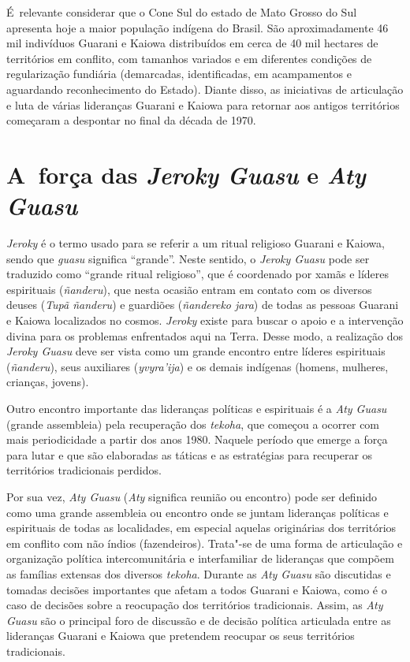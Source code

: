 É~relevante considerar que o Cone Sul do estado de Mato Grosso do Sul
apresenta hoje a maior população indígena do Brasil. São
aproximadamente 46 mil indivíduos Guarani e Kaiowa distribuídos em
cerca de 40 mil hectares de territórios em conflito, com tamanhos
variados e em diferentes condições de regularização fundiária
(demarcadas, identificadas, em acampamentos e aguardando reconhecimento
do Estado). Diante disso, as iniciativas de articulação e luta de
várias lideranças Guarani e Kaiowa para retornar aos antigos
territórios começaram a despontar no final da década de 1970.

\section{A~força das \emph{Jeroky Guasu} e \emph{Aty Guasu}}

\emph{Jeroky} é o termo usado para se referir a um ritual religioso Guarani e
Kaiowa, sendo que \emph{guasu} significa ``grande''. Neste sentido, o \emph{Jeroky
Guasu} pode ser traduzido como ``grande ritual religioso'', que é
coordenado por xamãs e líderes espirituais (\emph{ñanderu}), que nesta ocasião
entram em contato com os diversos deuses (\emph{Tupã ñanderu}) e guardiões
(\emph{ñandereko jara}) de todas as pessoas Guarani e Kaiowa localizados no
cosmos. \emph{Jeroky} existe para buscar o apoio e a intervenção divina para
os problemas enfrentados aqui na Terra. Desse modo, a realização dos
\emph{Jeroky Guasu} deve ser vista como um grande encontro entre líderes
espirituais (\emph{ñanderu}), seus auxiliares (\emph{yvyra’ija}) e os demais
indígenas (homens, mulheres, crianças, jovens). 

Outro encontro importante das lideranças políticas e espirituais é a \emph{Aty
Guasu} (grande assembleia) pela recuperação dos \emph{tekoha}, que começou a
ocorrer com mais periodicidade a partir dos anos 1980. Naquele período
que emerge a força para lutar e que são elaboradas as táticas e as
estratégias para recuperar os territórios tradicionais perdidos.

Por sua vez, \emph{Aty Guasu} (\emph{Aty} significa reunião ou encontro) pode ser
definido como uma grande assembleia ou encontro onde se juntam
lideranças políticas e espirituais de todas as localidades, em especial
aquelas originárias dos territórios em conflito com não índios
(fazendeiros). Trata"-se de uma forma de articulação e organização
política intercomunitária e interfamiliar de lideranças que compõem as
famílias extensas dos diversos \emph{tekoha}. Durante as \emph{Aty Guasu} são
discutidas e tomadas decisões importantes que afetam a todos Guarani e
Kaiowa, como é o caso de decisões sobre a reocupação dos territórios
tradicionais. Assim, as \emph{Aty Guasu} são o principal foro de discussão e
de decisão política articulada entre as lideranças Guarani e Kaiowa que
pretendem reocupar os seus territórios tradicionais. 

